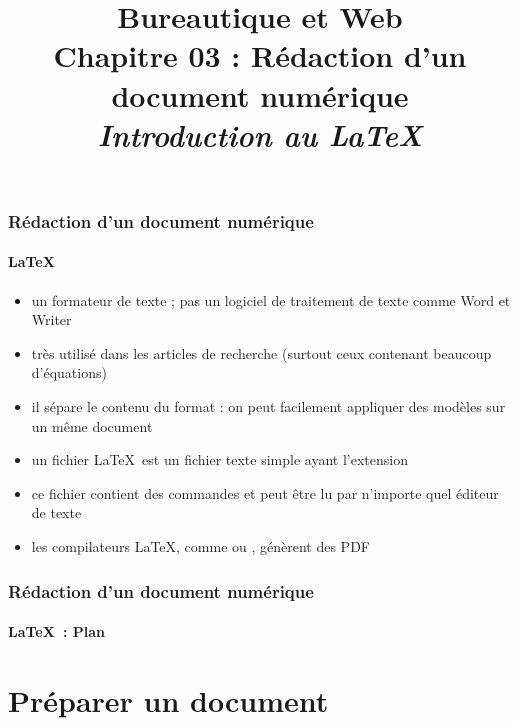 \documentclass[xcolor=table]{beamer}
\title[BWEB : 03- Rédaction (\LaTeX)] %
{Bureautique et Web \\Chapitre 03 : Rédaction d'un document numérique \\ \slshape\small Introduction au \LaTeX}
\begin{document}
\begin{frame}
\frametitle{Rédaction d'un document numérique}
\framesubtitle{\LaTeX}

\begin{itemize}
	\item un formateur de texte ; pas un logiciel de traitement de texte comme Word et Writer
	\item très utilisé dans les articles de recherche (surtout ceux contenant beaucoup d'équations)
	\item il sépare le contenu du format : on peut facilement appliquer des modèles sur un même document
	\item un fichier \LaTeX\ est un fichier texte simple ayant l'extension 
	\item ce fichier contient des commandes et peut être lu par n'importe quel éditeur de texte
	\item les compilateurs \LaTeX, comme  ou , génèrent des PDF
	
\end{itemize}

\end{frame}

\begin{frame}
\frametitle{Rédaction d'un document numérique}
\framesubtitle{\LaTeX\ : Plan}

\begin{multicols}{2}
\tableofcontents
\end{multicols}
\end{frame}

\section{Préparer un document}
\end{document}
